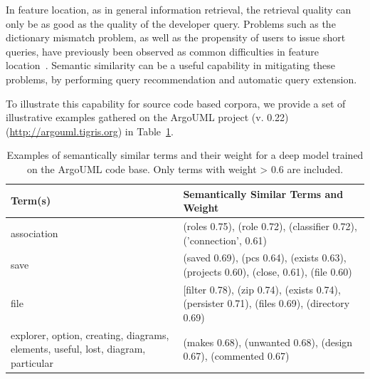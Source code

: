 In feature location, as in general information retrieval, the
retrieval quality can only be as good as the quality of the developer
query. Problems such as the dictionary mismatch problem, as well as
the propensity of users to issue short queries, have previously been
observed as common difficulties in feature
location~\cite{haiduc_effect_2011, damevski_field_2015}. Semantic
similarity can be a useful capability in mitigating these problems, by
performing query recommendation and automatic query extension.

To illustrate this capability for source code based corpora, we
provide a set of illustrative examples gathered on the ArgoUML project
(v. 0.22) (\url{http://argouml.tigris.org}) in Table~\ref{tab:semsim}.


\begin{table}[h!]
\centering
\small
\caption{Examples of semantically similar terms and their weight for a deep model trained on
the ArgoUML code base. Only terms with weight > 0.6 are included.}
\label{tab:semsim}
\begin{tabular}{|p{}|p{}|}
\hline \hline
Term(s) & Semantically Similar Terms and Weight\\ \hline 
association & (roles 0.75), (role 0.72), (classifier 0.72), ('connection', 0.61) \\ \hline
save & (saved 0.69), (pcs 0.64), (exists 0.63), (projects 0.60), (close, 0.61), (file 0.60) \\ \hline
file & [filter 0.78), (zip 0.74), (exists 0.74), (persister 0.71), (files 0.69), (directory 0.69) \\ \hline
explorer, option, creating, diagrams, elements, useful, lost, diagram, particular & (makes 0.68), (unwanted 0.68), (design 0.67), (commented 0.67) \\
\hline \hline
\end{tabular}
\end{table}


